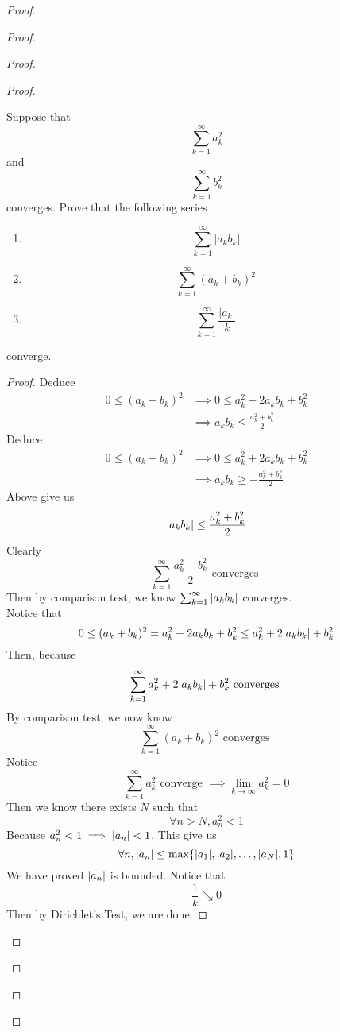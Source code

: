 \documentclass{report}
\begin{document}
\begin{proof}
\begin{proof}
\begin{proof}
\begin{proof}
\begin{question}{}{}
Suppose that 
\[
\sum_{k=1}^{\infty} a_k^2
\]
and 
\[
\sum_{k=1}^{\infty} b_k^2
\]
converges. Prove that the following series
\begin{enumerate}
    \item \[
    \sum_{k=1}^{\infty} |a_kb_k|
    \]
    \item \[
    \sum_{k=1}^{\infty} (a_k + b_k)^2
    \]
    \item \[
    \sum_{k=1}^{\infty} \frac{|a_k|}{k}
    \]
\end{enumerate}
converge.
\end{question}
\begin{proof}
Deduce 
\begin{align}
  0\leq (a_k-b_k)^{2}&\implies 0\leq a_k^2-2a_kb_k+b_k^2\\
  &\implies a_kb_k\leq \frac{a_k^2+b_k^2}{2}
\end{align}
Deduce
\begin{align}
  0\leq (a_k+b_k)^2&\implies 0\leq a_k^2+2a_kb_k+b_k^2\\
&\implies a_kb_k\geq  -\frac{a_k^2+b_k^2}{2}
\end{align}
Above give us
\begin{equation}
|a_kb_k|\leq \frac{a_k^2+b_k^2}{2}
\end{equation}
Clearly
\begin{equation}
\sum_{k=1}^\infty \frac{a_k^2+b_k^2}{2}\text{ converges }
\end{equation}
Then by comparison test, we know $\sum_{k=1}^\infty |a_kb_k|$ converges.\\

Notice that
\begin{equation}
  0\leq (a_k+b_k)^2=a_k^2 +2a_kb_k+b_k^2 \leq a_k^2+2|a_kb_k|+b_k^2 
\end{equation}
Then, because 
\begin{equation}
\sum_{k=1}^\infty a_k^2 +2|a_kb_k|+b_k^2\text{ converges }
\end{equation}
By comparison test, we now know 
\begin{equation}
\sum_{k=1}^\infty (a_k+b_k)^2 \text{ converges }
\end{equation}
Notice
\begin{equation}
\sum_{k=1}^\infty a_k^2\text{ converge }\implies \lim_{k\to\infty}a_k^2=0
\end{equation}
Then we know there exists $N$ such that
 \begin{equation}
\forall n>N, a_n^2<1
\end{equation}
Because $a_n^2<1\implies |a_n|<1$. This give us
\begin{equation}
\forall n, |a_n|\leq \max \{ |a_1|,|a_2|,\dots ,|a_N|,1 \}
\end{equation}
We have proved $|a_n|$ is bounded. Notice that 
\begin{equation}
\frac{1}{k}\searrow 0
\end{equation}
Then by Dirichlet's Test, we are done.


\end{proof}
\end{proof}
\end{proof}
\end{proof}
\end{proof}
\end{document}
